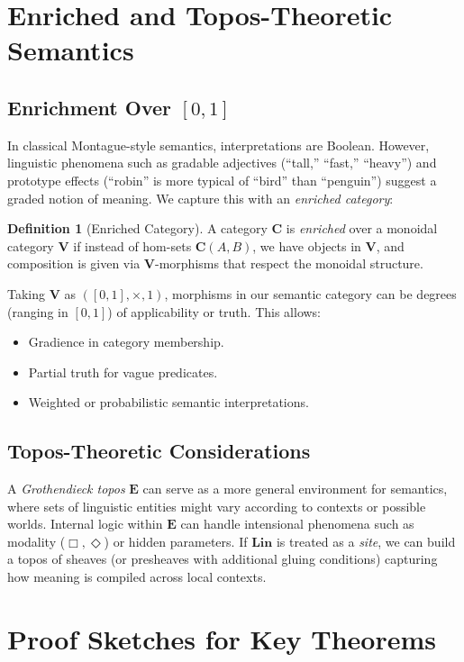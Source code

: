 \documentclass[12pt]{article}
\theoremstyle{plain}
\theoremstyle{definition}
\newtheorem{definition}[theorem]{Definition}
\begin{document}
\section{Enriched and Topos-Theoretic Semantics}
\subsection{Enrichment Over \([0,1]\)}
In classical Montague-style semantics, interpretations are Boolean. However, linguistic phenomena such as gradable adjectives (“tall,” “fast,” “heavy”) and prototype effects (“robin” is more typical of “bird” than “penguin”) suggest a graded notion of meaning. We capture this with an \emph{enriched category}:

\begin{definition}[Enriched Category]
A category \(\mathbf{C}\) is \emph{enriched} over a monoidal category \(\mathbf{V}\) if instead of hom-sets \(\mathbf{C}(A,B)\), we have objects in \(\mathbf{V}\), and composition is given via \(\mathbf{V}\)-morphisms that respect the monoidal structure.
\end{definition}

Taking \(\mathbf{V}\) as \(([0,1], \times, 1)\), morphisms in our semantic category can be degrees (ranging in \([0,1]\)) of applicability or truth. This allows:

\begin{itemize}
    \item Gradience in category membership.
    \item Partial truth for vague predicates.
    \item Weighted or probabilistic semantic interpretations.
\end{itemize}

\subsection{Topos-Theoretic Considerations}
A \emph{Grothendieck topos} \(\mathbf{E}\) can serve as a more general environment for semantics, where sets of linguistic entities might vary according to contexts or possible worlds. Internal logic within \(\mathbf{E}\) can handle intensional phenomena such as modality (\(\Box, \Diamond\)) or hidden parameters. If \(\mathbf{Lin}\) is treated as a \emph{site}, we can build a topos of sheaves (or presheaves with additional gluing conditions) capturing how meaning is compiled across local contexts.

\section{Proof Sketches for Key Theorems}
\end{document}
